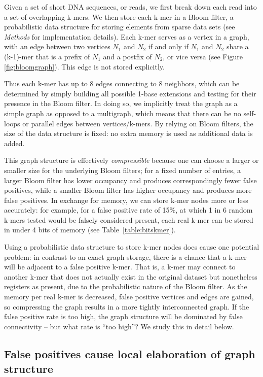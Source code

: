 \documentclass{pnastwo}
\begin{document}
\begin{article}
Given a set of short DNA sequences, or reads, we first break down each
read into a set of overlapping k-mers.  We then store each k-mer in a
Bloom filter, a probabilistic data structure for storing elements from sparse data
sets (see \emph{Methods} for implementation details).  Each k-mer
serves as a vertex in a graph, with an edge between two vertices $N_1$
and $N_2$ if and only if $N_1$ and $N_2$ share a (k-1)-mer that is a
prefix of $N_1$ and a postfix of $N_2$, or vice versa (see Figure
\ref{fig:bloomgraph}).  This edge is not stored explicitly.

Thus each k-mer has up to 8 edges connecting to 8 neighbors, which can be determined by
simply building all possible 1-base extensions and testing for their
presence in the Bloom filter.  In doing so, we implicitly treat the
graph as a simple graph as opposed to a multigraph, which
means that there can be no self-loops or parallel edges between
vertices/k-mers.  By relying on Bloom filters, the size of the data structure 
is fixed: no extra memory is used as additional data is
added.

This graph structure is effectively {\em compressible} because one can
choose a larger or smaller size for the underlying Bloom filters; for
a fixed number of entries, a larger Bloom filter has lower occupancy
and produces correspondingly fewer false positives, while a smaller
Bloom filter has higher occupancy and produces more false
positives. In exchange for memory, we can store k-mer nodes more or
less accurately: for example, for a false positive rate of 15\%, at
which 1 in 6 random k-mers tested would be falsely considered present,
each real k-mer can be stored in under 4 bits of memory (see
Table~\ref{table:bitskmer}).	

Using a probabilistic data structure to store k-mer nodes does
cause one potential problem: in contrast to an exact graph storage, there is a chance that a k-mer
will be adjacent to a false positive k-mer.  That is, a k-mer may
connect to another k-mer that does not actually exist in the original
dataset but nonetheless registers as present, due to the probabilistic
nature of the Bloom filter.  As the memory per real k-mer is
decreased, false positive vertices and edges are gained, so
compressing the graph results in a more tightly interconnected graph.
If the false positive rate is too high, the graph structure will be
dominated by false connectivity -- but what rate is ``too high''?  We
study this in detail below.

\subsection{False positives cause local elaboration of graph structure}


\end{article}
\end{document}
